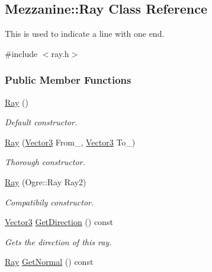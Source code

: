 \hypertarget{classMezzanine_1_1Ray}{
\subsection{Mezzanine::Ray Class Reference}
\label{classMezzanine_1_1Ray}
}


This is used to indicate a line with one end.  




{\ttfamily \#include $<$ray.h$>$}

\subsubsection*{Public Member Functions}
\begin{DoxyCompactItemize}
\item 
\hyperlink{classMezzanine_1_1Ray_ad189f8e1e9a28bb50c1da50d24e988b4}{Ray} ()
\begin{DoxyCompactList}\small\item\em Default constructor. \item\end{DoxyCompactList}\item 
\hyperlink{classMezzanine_1_1Ray_a9b7c14d23e934927b6c35b81c65b9916}{Ray} (\hyperlink{classMezzanine_1_1Vector3}{Vector3} From\_\-, \hyperlink{classMezzanine_1_1Vector3}{Vector3} To\_\-)
\begin{DoxyCompactList}\small\item\em Thorough constructor. \item\end{DoxyCompactList}\item 
\hyperlink{classMezzanine_1_1Ray_a60cc4b4fd34049f7cb36d8aa402f9005}{Ray} (Ogre::Ray Ray2)
\begin{DoxyCompactList}\small\item\em Compatibily constructor. \item\end{DoxyCompactList}\item 
\hyperlink{classMezzanine_1_1Vector3}{Vector3} \hyperlink{classMezzanine_1_1Ray_a25326a57c34b359064c9161ed2eeb004}{GetDirection} () const 
\begin{DoxyCompactList}\small\item\em Gets the direction of this ray. \item\end{DoxyCompactList}\item 
\hyperlink{classMezzanine_1_1Ray}{Ray} \hyperlink{classMezzanine_1_1Ray_a7164d929caf75bcebceed9149e9a3540}{GetNormal} () const 

\end{DoxyCompactItemize}
